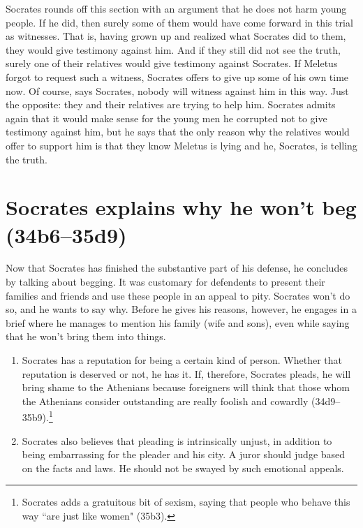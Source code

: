 \documentclass[11pt]{article}
\begin{document}
Socrates rounds off this section with an argument that he does not harm young people.  If he did, then surely some of them would have come forward in this trial as witnesses.  That is, having grown up and realized what Socrates did to them, they would give testimony against him.  And if they still did not see the truth, surely one of their relatives would give testimony against Socrates.  If Meletus forgot to request such a witness, Socrates offers to give up some of his own time now.  Of course, says Socrates, nobody will witness against him in this way.  Just the opposite: they and their relatives are trying to help him.  Socrates admits again that it would make sense for the young men he corrupted not to give testimony against him, but he says that the only reason why the relatives would offer to support him is that they know Meletus is lying and he, Socrates, is telling the truth.

\section{Socrates explains why he won't beg (34b6--35d9)}

Now that Socrates has finished the substantive part of his defense, he concludes by talking about begging.  It was customary for defendents to present their families and friends and use these people in an appeal to pity.  Socrates won't do so, and he wants to say why.  Before he gives his reasons, however, he engages in a brief  where he manages to mention his family (wife and sons), even while saying that he won't bring them into things.

\begin{enumerate}
    \item Socrates has a reputation for being a certain kind of person.  Whether that reputation is deserved or not, he has it. If, therefore, Socrates pleads, he will bring shame to the Athenians because foreigners will think that those whom the Athenians consider outstanding are really foolish and cowardly (34d9--35b9).\footnote{Socrates adds a gratuitous bit of sexism, saying that people who behave this way ``are just like women" (35b3).}
    \item Socrates also believes that pleading is intrinsically unjust, in addition to being embarrassing for the pleader and his city.  A juror should judge based on the facts and laws.  He should not be swayed by such emotional appeals.
\end{enumerate}
\end{document}
